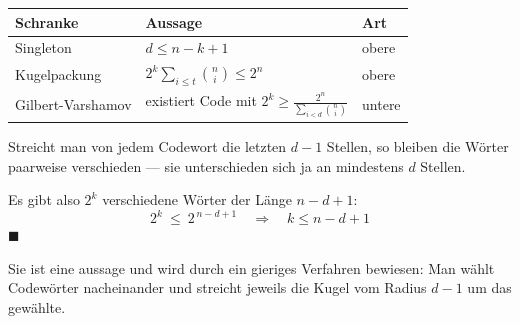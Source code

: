 \begin{merksatz}
\begin{center}
{\small
\renewcommand{\arraystretch}{1.55}
\begin{tabular}{@{}P{2.4cm}P{2.8cm}P{2.8cm}@{}}
\toprule
\textbf{Schranke} & \textbf{Aussage} & \textbf{Art}\\
\midrule
Singleton & $d \le n-k+1$ & obere\\
Kugelpackung & $2^{k}\sum_{i\le t}\binom{n}{i} \le 2^{n}$ & obere\\
Gilbert-Varshamov & existiert Code mit $2^{k} \ge \frac{2^{n}}{\sum_{i<d}\binom{n}{i}}$ & untere\\
\bottomrule
\end{tabular}}
\end{center}

Streicht man von jedem Codewort die letzten $d-1$ Stellen, so bleiben die Wörter paarweise verschieden --- sie unterschieden sich ja an mindestens $d$ Stellen.

Es gibt also $2^{k}$ verschiedene Wörter der Länge $n-d+1$:
\[ 2^{k} \ \le\ 2^{\,n-d+1} \quad\Longrightarrow\quad k \le n-d+1 \]
$\blacksquare$

\begin{center}
\begin{minipage}{0.88\textwidth}
\end{minipage}
\end{center}

Sie ist eine aussage und wird durch ein gieriges Verfahren bewiesen: Man wählt Codewörter nacheinander und streicht jeweils die Kugel vom Radius $d-1$ um das gewählte.

\begin{center}
\begin{minipage}{0.88\textwidth}
\end{minipage}
\end{center}
\end{merksatz}

